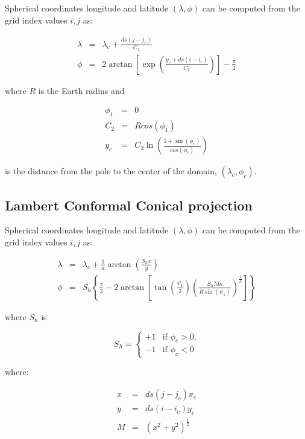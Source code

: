 Spherical coordinates longitude and latitude $(\lambda, \phi)$ can be computed
from the grid index values $i,j$ as:

\begin{eqnarray}
  \lambda &=& \lambda_c + \frac{ds \left(j-j_c\right)}{C_2} \\
  \phi &=& 2 \arctan\left[\exp\left(\frac{y_c + 
         ds\left(i-i_c\right)}{C_2}\right)\right]-\frac{\pi}{2}
\end{eqnarray}

where $R$ is the Earth radius and

\begin{eqnarray}
  \phi_1 &=& 0 \\
  C_2 &=& R cos(\phi_1) \\
  y_c &=& C_2 \ln \left(\frac{1+\sin(\phi_c)}{cos(\phi_c)}\right)
\end{eqnarray}

is the distance from the pole to the center of the domain, $(\lambda_c,\phi_c)$.

\subsection{Lambert Conformal Conical projection}

Spherical coordinates longitude and latitude $(\lambda, \phi)$ can be computed
from the grid index values $i,j$ as:

\begin{eqnarray}
  \lambda &=& \lambda_c +
         \frac{1}{\kappa}\arctan\left(\frac{S_h x}{y}\right) \\
   \phi &=& S_h \left\{ \frac{\pi}{2} - 
          2 \arctan\left[ \tan\left(\frac{\psi_1}{2}\right) \left(
         \frac{S_h M \kappa}{R \sin(\psi_1)}\right)^{\frac{1}{\kappa}}\right]
         \right\}
\end{eqnarray}

where $S_h$ is

\begin{equation}
  S_h = 
  \begin{cases}
    +1 & \text{if $\phi_c > 0$,} \\
    -1 & \text{if $\phi_c < 0$}
  \end{cases}
\end{equation}

where:

\begin{eqnarray}
  x &=& ds \left(j-j_c\right) x_c \\
  y &=& ds \left(i-i_c\right) y_c \\
  M &=& \left(x^2+y^2\right)^{\frac{1}{2}} \\
\end{eqnarray}

